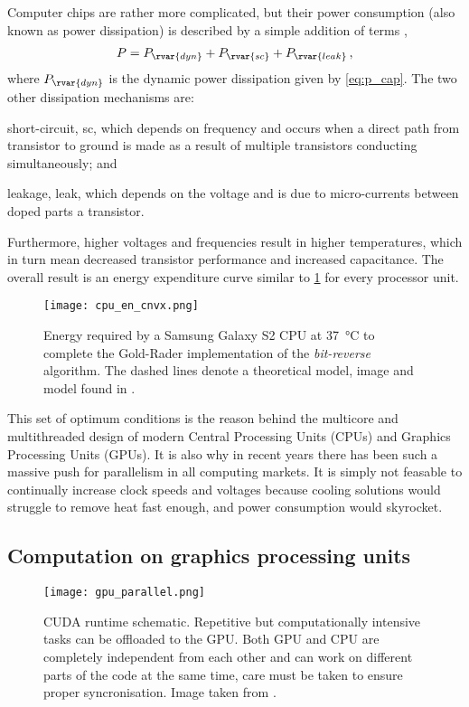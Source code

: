 Computer chips are rather more complicated, but their power consumption (also known as power dissipation) is described by a simple addition of terms \cite{cpu_pow},
\begin{align}
    P = P_{\rvar{dyn}} + P_{\rvar{sc}} + P_{\rvar{leak}}\,,
\end{align}
where $ P_{\rvar{dyn}} $ is the dynamic power dissipation given by \cref{eq:p_cap}. The two other dissipation mechanisms are:
\begin{inparaenum}[\itshape 1\upshape)]
    \item short-circuit, sc, which depends on frequency and occurs when a direct path from transistor to ground is made as a result of multiple transistors conducting simultaneously; and
    \item leakage, leak, which depends on the voltage and is due to micro-currents between doped parts a transistor.
\end{inparaenum}
Furthermore, higher voltages and frequencies result in higher temperatures, which in turn mean decreased transistor performance and increased capacitance. The overall result is an energy expenditure curve similar to \cref{f:cpu_en_cnvx} \cite{cpu_en_cnvx} for every processor unit.
\begin{figure}[t]
    \centering
    \texttt{[image: cpu\_en\_cnvx.png]}
    \caption[Energy expenditure of CPU vs Voltage.]{Energy required by a Samsung Galaxy S2 CPU at \SI{37}{\degreeCelsius} to complete the Gold-Rader implementation of the \emph{bit-reverse} algorithm. The dashed lines denote a theoretical model, image and model found in \cite{cpu_en_cnvx}.}
    \label{f:cpu_en_cnvx}
\end{figure}

This set of optimum conditions is the reason behind the multicore and multithreaded design of modern Central Processing Units (CPUs) and Graphics Processing Units (GPUs). It is also why in recent years there has been such a massive push for parallelism in all computing markets. It is simply not feasable to continually increase clock speeds and voltages because cooling solutions would struggle to remove heat fast enough, and power consumption would skyrocket.

\subsection{Computation on graphics processing units}
\begin{figure}[t]
    \centering
    \texttt{[image: gpu\_parallel.png]}
    \caption[CUDA runtime schematic.]{CUDA runtime schematic. Repetitive but computationally intensive tasks can be offloaded to the GPU. Both GPU and CPU are completely independent from each other and can work on different parts of the code at the same time, care must be taken to ensure proper syncronisation. Image taken from \cite{nvidia}.}
    \label{f:cuda}
\end{figure}

